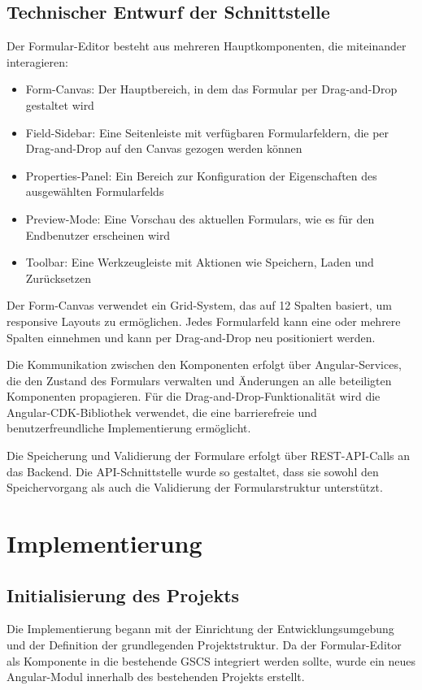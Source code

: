 \documentclass[a4paper,11pt]{article}
\begin{document}
\subsection{Technischer Entwurf der Schnittstelle}
Der Formular-Editor besteht aus mehreren Hauptkomponenten, die miteinander interagieren:

\begin{itemize}
  \item Form-Canvas: Der Hauptbereich, in dem das Formular per Drag-and-Drop gestaltet wird
  \item Field-Sidebar: Eine Seitenleiste mit verfügbaren Formularfeldern, die per Drag-and-Drop auf den Canvas gezogen werden können
  \item Properties-Panel: Ein Bereich zur Konfiguration der Eigenschaften des ausgewählten Formularfelds
  \item Preview-Mode: Eine Vorschau des aktuellen Formulars, wie es für den Endbenutzer erscheinen wird
  \item Toolbar: Eine Werkzeugleiste mit Aktionen wie Speichern, Laden und Zurücksetzen
\end{itemize}

Der Form-Canvas verwendet ein Grid-System, das auf 12 Spalten basiert, um responsive Layouts zu ermöglichen. Jedes Formularfeld kann eine oder mehrere Spalten einnehmen und kann per Drag-and-Drop neu positioniert werden.

Die Kommunikation zwischen den Komponenten erfolgt über Angular-Services, die den Zustand des Formulars verwalten und Änderungen an alle beteiligten Komponenten propagieren. Für die Drag-and-Drop-Funktionalität wird die Angular-CDK-Bibliothek verwendet, die eine barrierefreie und benutzerfreundliche Implementierung ermöglicht.

Die Speicherung und Validierung der Formulare erfolgt über REST-API-Calls an das Backend. Die API-Schnittstelle wurde so gestaltet, dass sie sowohl den Speichervorgang als auch die Validierung der Formularstruktur unterstützt.

\section{Implementierung}
\subsection{Initialisierung des Projekts}
Die Implementierung begann mit der Einrichtung der Entwicklungsumgebung und der Definition der grundlegenden Projektstruktur. Da der Formular-Editor als Komponente in die bestehende GSCS integriert werden sollte, wurde ein neues Angular-Modul innerhalb des bestehenden Projekts erstellt.
\end{document}

